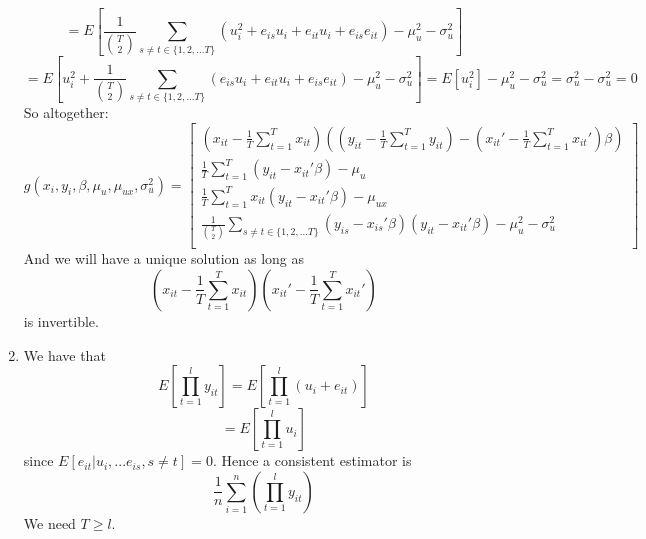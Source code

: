 \documentclass[10pt,letter]{article}
\begin{document}
\begin{enumerate}[label=(\alph*)]
\[ = E\left[\frac{1}{\binom{T}{2}}\sum_{s \neq t \in \{1,2, ... T\}} (u_i^2 + e_{is}u_i + e_{it}u_i + e_{is}e_{it}) - \mu_{u}^2 - \sigma^2_u \right] \]
\[ = E\left[u_i^2 + \frac{1}{\binom{T}{2}}\sum_{s \neq t \in \{1,2, ... T\}} (e_{is}u_i + e_{it}u_i + e_{is}e_{it}) - \mu_{u}^2 - \sigma^2_u \right] = E[u_i^2] - \mu_u^2 - \sigma_u^2 = \sigma_u^2 - \sigma_u^2 = 0 \]
So altogether:
\[ g(x_i, y_i, \beta, \mu_u, \mu_{ux}, \sigma_u^2) = \begin{bmatrix}
\left( x_{it} - \frac{1}{T}\sum_{t=1}^T x_{it}\right) \left(\left(y_{it} - \frac{1}{T}\sum_{t=1}^T y_{it}\right) - \left( x_{it}' - \frac{1}{T}\sum_{t=1}^T x_{it}' \right)\beta \right) \\
\frac{1}{T}\sum_{t=1}^T (y_{it} - x_{it}'\beta) - \mu_u \\
\frac{1}{T}\sum_{t=1}^T x_{it}(y_{it} - x_{it}'\beta) - \mu_{ux}  \\
\frac{1}{\binom{T}{2}}\sum_{s \neq t \in \{1,2, ... T\}} (y_{is} - x_{is}'\beta)(y_{it} - x_{it}'\beta) - \mu_{u}^2 - \sigma^2_u \\
\end{bmatrix} \]
And we will have a unique solution as long as
\[\left( x_{it} - \frac{1}{T}\sum_{t=1}^T x_{it}\right)\left( x_{it}' - \frac{1}{T}\sum_{t=1}^T x_{it}'\right) \]
is invertible.

\item We have that
\[ E\left[\prod_{t=1}^l y_{it}\right] = E\left[\prod_{t=1}^l(u_i + e_{it})\right] \]
\[ = E\left[\prod_{t=1}^l u_i\right]\]
since $E[e_{it} | u_i, ... e_{is}, s\neq t] = 0$. Hence a consistent estimator is
\[ \frac{1}{n}\sum_{i=1}^n \left( \prod_{t=1}^l y_{it} \right) \]
We need $T \ge l$.
\end{enumerate}
\end{document}
